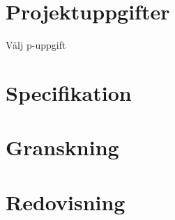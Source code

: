 \mode*

\section{Projektuppgifter}

\begin{frame}
  Välj p-uppgift
\end{frame}


\section{Specifikation}


\section{Granskning}


\section{Redovisning}
